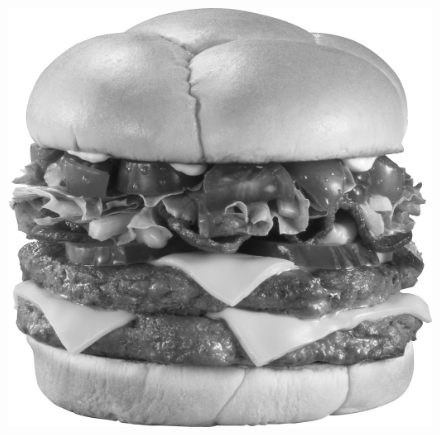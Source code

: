 \begin{figure}[h!]
    \centering
    \includegraphics[scale=0.48,keepaspectratio=true]{img/imgs/6-comida/burger.jpg}
\end{figure}


